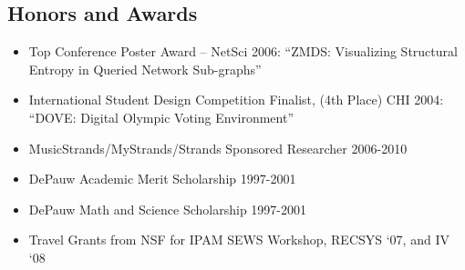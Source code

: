 \documentclass[overlapped,line,letterpaper]{res}
\begin{document}
\begin{resume}
\section{\bf Honors and Awards}
\begin{itemize}
	\item Top Conference Poster Award – NetSci 2006:
	“ZMDS: Visualizing Structural Entropy in Queried Network Sub-graphs”
	\item International Student Design Competition Finalist, (4th Place) CHI 2004:
	“DOVE: Digital Olympic Voting Environment”
	\item MusicStrands/MyStrands/Strands Sponsored Researcher 2006-2010
	\item DePauw Academic Merit Scholarship
	1997-2001
	\item DePauw Math and Science Scholarship
	1997-2001
	\item Travel Grants from NSF for IPAM SEWS Workshop, RECSYS `07, and IV `08

\end{itemize}


\end{resume}
\end{document}
